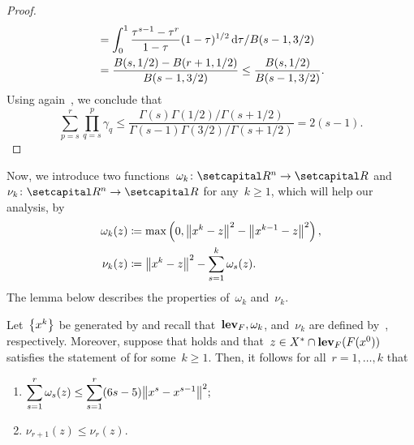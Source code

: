 \documentclass[../main]{subfiles}
\begin{document}
\begin{proof}
\begin{equation}
\begin{split}
        &= \int_{0}^{1} \frac{\tau^{s - 1} - \tau^r}{1 - \tau} (1 - \tau)^{1 / 2} \odif{\tau} / B(s - 1, 3 / 2) \\
        &= \frac{B(s, 1 / 2) - B(r + 1, 1 / 2)}{B(s - 1, 3 / 2)} 
        \le \frac{B(s, 1 / 2)}{B(s - 1, 3 / 2)}
        .\end{split}
    \end{equation} 
    Using again~, we conclude that
    \begin{equation}
        \sum_{p = s}^{r} \prod_{q = s}^{p} \gamma_q
        \le \frac{\Gamma(s) \Gamma(1 / 2) / \Gamma(s + 1 / 2)}{\Gamma(s - 1) \Gamma(3 / 2) / \Gamma(s + 1 / 2)}
        = 2 (s - 1)
    .\end{equation} 
\end{proof}

Now, we introduce two functions~$\omega_k \colon \setR^n \to \setR$ and~$\nu_k \colon \setR^n \to \setR$ for any~$k \ge 1$, which will help our analysis, by
\begin{align}
    \omega_k(z) &\coloneqq \max \left( 0, \norm*{x^k - z}^2 - \norm*{x^{k - 1} - z}^2 \right) \label{eq:omega}, \\
    \nu_k(z) &\coloneqq \norm*{x^k - z}^2 - \sum_{s = 1}^{k} \omega_s(z) \label{eq:nu}
.\end{align}
The lemma below describes the properties of~$\omega_k$ and~$\nu_k$.
\begin{lemma} 
    Let~$\set*{x^k}$ be generated by  and recall that~$\level_F, \omega_k$, and~$\nu_k$ are defined by~, respectively.
    Moreover, suppose that  holds and that~$z \in X^\ast \cap \level_F(F(x^0))$ satisfies the statement of  for some~$k \ge 1$.
    Then, it follows for all~$r = 1, \dots, k$ that
    \begin{enumerate}
        \item $\displaystyle \sum_{s = 1}^{r} \omega_s(z) \le \sum_{s = 1}^{r}(6s - 5) \norm*{x^s - x^{s - 1}}^2;$ 
        \item $\displaystyle \nu_{r + 1}(z) \le \nu_r(z).$ 
    \end{enumerate}
\end{lemma}
\end{document}
